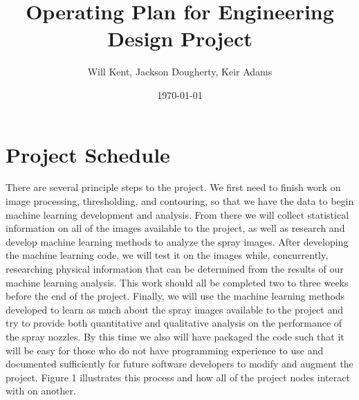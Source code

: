 \documentclass[12pt]{amsart}
\title{Operating Plan for Engineering Design Project}
\author{Will Kent, Jackson Dougherty, Keir Adams}
\date{\today}
\begin{document}
\maketitle





\section*{Project Schedule}

There are several principle steps to the project. We first need to finish work on image processing, thresholding, and contouring, so that we have the data to begin machine learning development and analysis. From there we will collect statistical information on all of the images available to the project, as well as research and develop machine learning methods to analyze the spray images. After developing the machine learning code, we will test it on the images while, concurrently, researching physical information that can be determined from the results of our machine learning analysis. This work should all be completed two to three weeks before the end of the project. Finally, we will use the machine learning methods developed to learn as much about the spray images available to the project and try to provide both quantitative and qualitative analysis on the performance of the spray nozzles. By this time we also will have packaged the code such that it will be easy for those who do not have programming experience to use and documented sufficiently for future software developers to modify and augment the project. Figure 1 illustrates this process and how all of the project nodes interact with on another.
\end{document}
